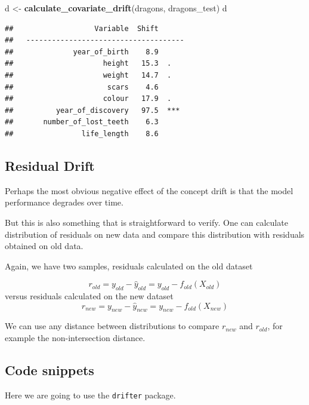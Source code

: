 \documentclass[12pt,]{krantz}
\newenvironment{Shaded}{\begin{snugshade}}{\end{snugshade}}
\newcommand{\KeywordTok}[1]{\textcolor[rgb]{0.13,0.29,0.53}{\textbf{#1}}}
\newcommand{\NormalTok}[1]{#1}
\newcommand{\StringTok}[1]{\textcolor[rgb]{0.31,0.60,0.02}{#1}}
\begin{document}
\begin{Shaded}
\begin{Highlighting}[]
\NormalTok{d <-}\StringTok{ }\KeywordTok{calculate_covariate_drift}\NormalTok{(dragons, dragons_test)}
\NormalTok{d}
\end{Highlighting}
\end{Shaded}

\begin{verbatim}
##                   Variable  Shift
##   -------------------------------------
##              year_of_birth    8.9  
##                     height   15.3  .
##                     weight   14.7  .
##                      scars    4.6  
##                     colour   17.9  .
##          year_of_discovery   97.5  ***
##       number_of_lost_teeth    6.3  
##                life_length    8.6
\end{verbatim}

\hypertarget{residual-drift}{%
\subsection{Residual Drift}\label{residual-drift}}

Perhaps the most obvious negative effect of the concept drift is that the model performance degrades over time.

But this is also something that is straightforward to verify. One can calculate distribution of residuals on new data and compare this distribution with residuals obtained on old data.

Again, we have two samples, residuals calculated on the old dataset

\[
r_{old} = y_{old} - \hat y_{old} = y_{old} - f_{old}(X_{old})
\]
versus residuals calculated on the new dataset
\[
r_{new} = y_{new} - \hat y_{new} = y_{new} - f_{old}(X_{new})
\]

We can use any distance between distributions to compare \(r_{new}\) and \(r_{old}\), for example the non-intersection distance.

\hypertarget{code-snippets-1}{%
\subsection{Code snippets}\label{code-snippets-1}}

Here we are going to use the \texttt{drifter} package.
\end{document}
